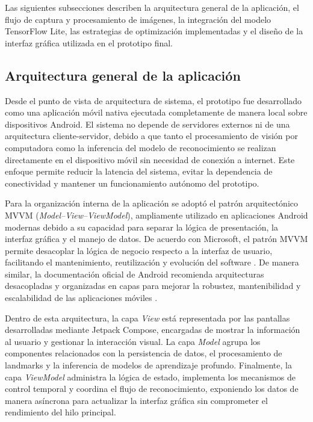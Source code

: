 	Las siguientes subsecciones describen la arquitectura general de la aplicación, el flujo de captura y procesamiento de imágenes, la integración del modelo TensorFlow Lite, las estrategias de optimización implementadas y el diseño de la interfaz gráfica utilizada en el prototipo final.
		
	\subsection{Arquitectura general de la aplicación}
	
	Desde el punto de vista de arquitectura de sistema, el prototipo fue desarrollado como una aplicación móvil nativa ejecutada completamente de manera local sobre dispositivos Android. El sistema no depende de servidores externos ni de una arquitectura cliente-servidor, debido a que tanto el procesamiento de visión por computadora como la inferencia del modelo de reconocimiento se realizan directamente en el dispositivo móvil sin necesidad de conexión a internet. Este enfoque permite reducir la latencia del sistema, evitar la dependencia de conectividad y mantener un funcionamiento autónomo del prototipo.
	
	Para la organización interna de la aplicación se adoptó el patrón arquitectónico MVVM (\textit{Model--View--ViewModel}), ampliamente utilizado en aplicaciones Android modernas debido a su capacidad para separar la lógica de presentación, la interfaz gráfica y el manejo de datos. De acuerdo con Microsoft, el patrón MVVM permite desacoplar la lógica de negocio respecto a la interfaz de usuario, facilitando el mantenimiento, reutilización y evolución del software \cite{microsoft_mvvm}. De manera similar, la documentación oficial de Android recomienda arquitecturas desacopladas y organizadas en capas para mejorar la robustez, mantenibilidad y escalabilidad de las aplicaciones móviles \cite{android_architecture}.
	
	Dentro de esta arquitectura, la capa \textit{View} está representada por las pantallas desarrolladas mediante Jetpack Compose, encargadas de mostrar la información al usuario y gestionar la interacción visual. La capa \textit{Model} agrupa los componentes relacionados con la persistencia de datos, el procesamiento de landmarks y la inferencia de modelos de aprendizaje profundo. Finalmente, la capa \textit{ViewModel} administra la lógica de estado, implementa los mecanismos de control temporal y coordina el flujo de reconocimiento, exponiendo los datos de manera asíncrona para actualizar la interfaz gráfica sin comprometer el rendimiento del hilo principal.
	
